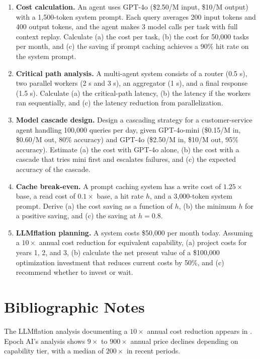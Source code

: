\documentclass[11pt]{book}
\begin{document}
\begin{enumerate}
\item \textbf{Cost calculation.} An agent uses GPT-4o (\$2.50/M input, \$10/M output) with a 1{,}500-token system prompt. Each query averages 200 input tokens and 400 output tokens, and the agent makes 3 model calls per task with full context replay. Calculate (a) the cost per task, (b) the cost for 50{,}000 tasks per month, and (c) the saving if prompt caching achieves a 90\% hit rate on the system prompt.

\item \textbf{Critical path analysis.} A multi-agent system consists of a router (0.5 s), two parallel workers (2 s and 3 s), an aggregator (1 s), and a final response (1.5 s). Calculate (a) the critical-path latency, (b) the latency if the workers ran sequentially, and (c) the latency reduction from parallelization.

\item \textbf{Model cascade design.} Design a cascading strategy for a customer-service agent handling 100{,}000 queries per day, given GPT-4o-mini (\$0.15/M in, \$0.60/M out, 80\% accuracy) and GPT-4o (\$2.50/M in, \$10/M out, 95\% accuracy). Estimate (a) the cost with GPT-4o alone, (b) the cost with a cascade that tries mini first and escalates failures, and (c) the expected accuracy of the cascade.

\item \textbf{Cache break-even.} A prompt caching system has a write cost of $1.25\times$ base, a read cost of $0.1\times$ base, a hit rate $h$, and a 3{,}000-token system prompt. Derive (a) the cost saving as a function of $h$, (b) the minimum $h$ for a positive saving, and (c) the saving at $h = 0.8$.

\item \textbf{LLMflation planning.} A system costs \$50{,}000 per month today. Assuming a $10\times$ annual cost reduction for equivalent capability, (a) project costs for years 1, 2, and 3, (b) calculate the net present value of a \$100{,}000 optimization investment that reduces current costs by 50\%, and (c) recommend whether to invest or wait.
\end{enumerate}

\section*{Bibliographic Notes}

The LLMflation analysis documenting a $10\times$ annual cost reduction appears in \cite{llmflation2024}. Epoch AI's analysis \cite{epochpricing2025} shows $9\times$ to $900\times$ annual price declines depending on capability tier, with a median of $200\times$ in recent periods.
\end{document}

